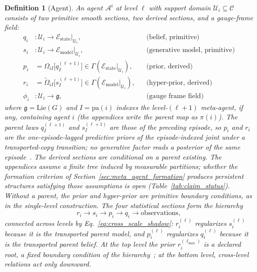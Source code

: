 \documentclass[11pt]{article}
\newtheorem{definition}{Definition}
\begin{document}
\begin{definition}[Agent]
An agent $\mathcal{A}^i$ at level $\ell$ with support domain $\mathcal{U}_i \subseteq \mathcal{C}$ consists of two primitive smooth sections, two derived sections, and a gauge-frame field:
\begin{align}
q_i &: \mathcal{U}_i \to \mathcal{E}_{\mathrm{state}}|_{\mathcal{U}_i}, &&\text{(belief, primitive)} \\
s_i &: \mathcal{U}_i \to \mathcal{E}_{\mathrm{model}}|_{\mathcal{U}_i}, &&\text{(generative model, primitive)} \\
p_i &= \Omega_{iI}\big[q_I^{(\ell+1)}\big] \in \Gamma\left(\mathcal{E}_{\mathrm{state}}|_{\mathcal{U}_i}\right), &&\text{(prior, derived)} \\
r_i &= \tilde\Omega_{iI}\big[s_I^{(\ell+1)}\big] \in \Gamma\left(\mathcal{E}_{\mathrm{model}}|_{\mathcal{U}_i}\right), &&\text{(hyper-prior, derived)} \\
\phi_i &: \mathcal{U}_i \to \mathfrak{g}, &&\text{(gauge frame field)}
\end{align}
where $\mathfrak{g}=\mathrm{Lie}(G)$ and $I=\mathrm{pa}(i)$ indexes the level-$(\ell+1)$ meta-agent, if any, containing agent $i$ (the appendices write the parent map as $\pi(i)$). The parent laws $q_I^{(\ell+1)}$ and $s_I^{(\ell+1)}$ are those of the preceding episode, so $p_i$ and $r_i$ are the one-episode-lagged predictive priors of the episode-indexed joint under a transported-copy transition; no generative factor reads a posterior of the same episode~\cite[Ch.~12]{DennisGaugeVFE2026}. The derived sections are conditional on a parent existing. The appendices assume a finite tree induced by measurable partitions; whether the formation criterion of Section~\ref{sec:meta_agent_formation} produces persistent structures satisfying those assumptions is open (Table~\ref{tab:claim_status}). Without a parent, the prior and hyper-prior are primitive boundary conditions, as in the single-level construction. The four statistical sections form the hierarchy
\[
r_i \to s_i \to p_i \to q_i \to \text{observations},
\]
connected across levels by Eq.~\eqref{eq:cross_scale_shadow}: $r_i^{(\ell)}$ regularizes $s_i^{(\ell)}$ because it is the transported parent model, and $p_i^{(\ell)}$ regularizes $q_i^{(\ell)}$ because it is the transported parent belief. At the top level the prior $r_i^{(\ell_{\max})}$ is a declared root, a fixed boundary condition of the hierarchy~\cite[Ch.~12]{DennisGaugeVFE2026}; at the bottom level, cross-level relations act only downward.
\end{definition}
\end{document}
